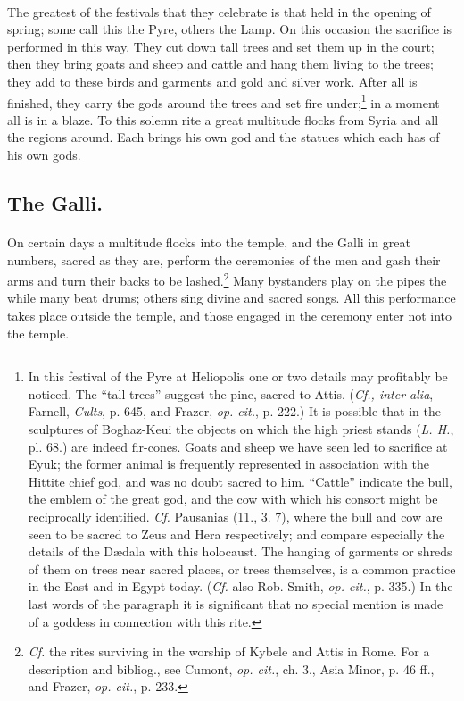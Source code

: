 \documentclass[a4paper, 11pt, oneside, polutonikogreek, english]{article}
\begin{document}
\paragraph{}
The greatest of the festivals that they celebrate is that held in the opening of spring; some call this the Pyre, others the Lamp. On this occasion the sacrifice is performed in this way. They cut down tall trees and set them up in the court; then they bring goats and sheep and cattle and hang them living to the trees; they add to these birds and garments and gold and silver work. After all is finished, they carry the gods around the trees and set fire under;\footnote{In this festival of the Pyre at Heliopolis one or two details may profitably be noticed. The ``tall trees'' suggest the pine, sacred to Attis. (\emph{Cf., inter alia}, Farnell, \emph{Cults}, p. 645, and Frazer, \emph{op. cit.}, p. 222.) It is possible that in the sculptures of Boghaz-Keui the objects on which the high priest stands (\emph{L. H.}, pl. 68.) are indeed fir-cones. Goats and sheep we have seen led to sacrifice at Eyuk; the former animal is frequently represented in association with the Hittite chief god, and was no doubt sacred to him. ``Cattle'' indicate the bull, the emblem of the great god, and the cow with which his consort might be reciprocally identified. \emph{Cf.} Pausanias (11., 3. 7), where the bull and cow are seen to be sacred to Zeus and Hera respectively; and compare especially the details of the Dædala with this holocaust. The hanging of garments or shreds of them on trees near sacred places, or trees themselves, is a common practice in the East and in Egypt today. (\emph{Cf.} also Rob.-Smith, \emph{op. cit.}, p. 335.) In the last words of the paragraph it is significant that no special mention is made of a goddess in connection with this rite.} in a moment all is in a blaze. To this solemn rite a great multitude flocks from Syria and all the regions around. Each brings his own god and the statues which each has of his own gods.

\subsection{The Galli.}
\paragraph{}
On certain days a multitude flocks into the temple, and the Galli in great numbers, sacred as they are, perform the ceremonies of the men and gash their arms and turn their backs to be lashed.\footnote{\emph{Cf.} the rites surviving in the worship of Kybele and Attis in Rome. For a description and bibliog., see Cumont, \emph{op. cit.}, ch. 3., Asia Minor, p. 46 ff., and Frazer, \emph{op. cit.}, p. 233.} Many bystanders play on the pipes the while many beat drums; others sing divine and sacred songs. All this performance takes place outside the temple, and those engaged in the ceremony enter not into the temple.
\end{document}
